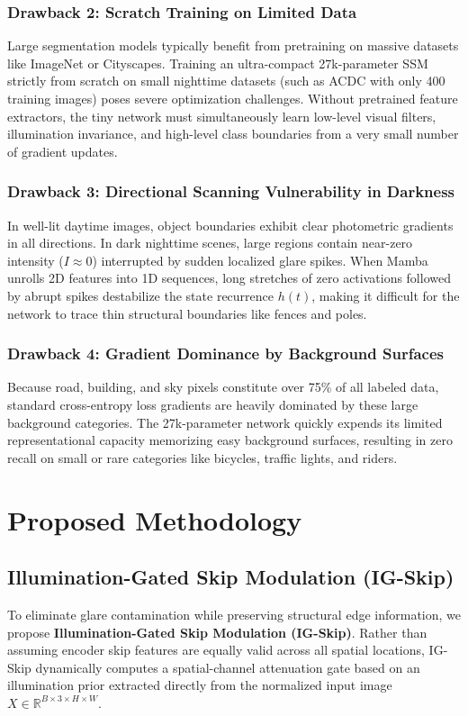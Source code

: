 \documentclass[conference]{IEEEtran}
\begin{document}
\subsubsection{Drawback 2: Scratch Training on Limited Data}
Large segmentation models typically benefit from pretraining on massive datasets like ImageNet or Cityscapes. Training an ultra-compact 27k-parameter SSM strictly from scratch on small nighttime datasets (such as ACDC with only 400 training images) poses severe optimization challenges. Without pretrained feature extractors, the tiny network must simultaneously learn low-level visual filters, illumination invariance, and high-level class boundaries from a very small number of gradient updates.

\subsubsection{Drawback 3: Directional Scanning Vulnerability in Darkness}
In well-lit daytime images, object boundaries exhibit clear photometric gradients in all directions. In dark nighttime scenes, large regions contain near-zero intensity ($I \approx 0$) interrupted by sudden localized glare spikes. When Mamba unrolls 2D features into 1D sequences, long stretches of zero activations followed by abrupt spikes destabilize the state recurrence $h(t)$, making it difficult for the network to trace thin structural boundaries like fences and poles.

\subsubsection{Drawback 4: Gradient Dominance by Background Surfaces}
Because road, building, and sky pixels constitute over 75\% of all labeled data, standard cross-entropy loss gradients are heavily dominated by these large background categories. The 27k-parameter network quickly expends its limited representational capacity memorizing easy background surfaces, resulting in zero recall on small or rare categories like bicycles, traffic lights, and riders.

\section{Proposed Methodology}

\subsection{Illumination-Gated Skip Modulation (IG-Skip)}
To eliminate glare contamination while preserving structural edge information, we propose \textbf{Illumination-Gated Skip Modulation (IG-Skip)}. Rather than assuming encoder skip features are equally valid across all spatial locations, IG-Skip dynamically computes a spatial-channel attenuation gate based on an illumination prior extracted directly from the normalized input image $X \in \mathbb{R}^{B \times 3 \times H \times W}$.
\end{document}
